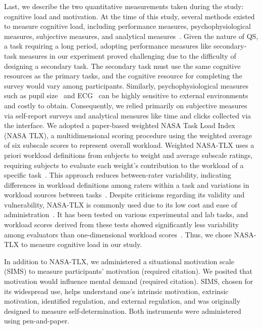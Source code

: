 Last, we describe the two quantitative measurements taken during the study: cognitive load and motivation. At the time of this study, several methods existed to measure cognitive load, including performance measures, psychophysiological measures, subjective measures, and analytical measures~\cite{gaoMentalWorkloadMeasurement2013}. Given the nature of QS, a task requiring a long period, adopting performance measures like secondary-task measures in our experiment proved challenging due to the difficulty of designing a secondary task. The secondary task must use the same cognitive resources as the primary tasks, and the cognitive resource for completing the survey would vary among participants. Similarly, psychophysiological measures such as pupil size~\cite{palinkoEstimatingCognitiveLoad2010} and ECG~\cite{haapalainenPsychophysiologicalMeasuresAssessing2010} can be highly sensitive to external environments and costly to obtain. Consequently, we relied primarily on subjective measures via self-report surveys and analytical measures like time and clicks collected via the interface. We adopted a paper-based weighted NASA Task Load Index (NASA TLX), a multidimensional scoring procedure using the weighted average of six subscale scores to represent overall workload. Weighted NASA-TLX uses a priori workload definitions from subjects to weight and average subscale ratings, requiring subjects to evaluate each weight's contribution to the workload of a specific task~\cite{hart1988development, hartNasaTaskLoadIndex2006a, cain2007review}. This approach reduces between-rater variability, indicating differences in workload definitions among raters within a task and variations in workload sources between tasks~\cite{cain2007review}. Despite criticisms regarding its validity and vulnerability, NASA-TLX is commonly used due to its low cost and ease of administration~\cite{gaoMentalWorkloadMeasurement2013}. It has been tested on various experimental and lab tasks, and workload scores derived from these tests showed significantly less variability among evaluators than one-dimensional workload scores~\cite{rubioEvaluationSubjectiveMental2004}. Thus, we chose NASA-TLX to measure cognitive load in our study.

In addition to NASA-TLX, we administered a situational motivation scale (SIMS) to measure participants' motivation (required citation). We posited that motivation would influence mental demand (required citation). SIMS, chosen for its widespread use, helps understand one's intrinsic motivation, extrinsic motivation, identified regulation, and external regulation, and was originally designed to measure self-determination. Both instruments were administered using pen-and-paper.